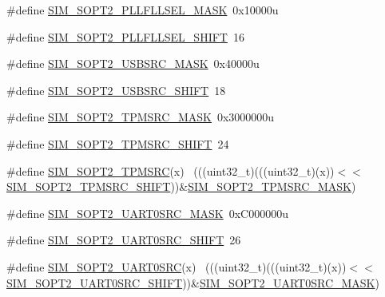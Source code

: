 \begin{DoxyCompactItemize}
\item 
\#define \hyperlink{group___s_i_m___register___masks_gaa14141a225f9778babacbf3b90d0bae2}{S\+I\+M\+\_\+\+S\+O\+P\+T2\+\_\+\+P\+L\+L\+F\+L\+L\+S\+E\+L\+\_\+\+M\+A\+SK}~0x10000u
\item 
\#define \hyperlink{group___s_i_m___register___masks_gae98b4d574b65472bdb294092d4ce5b4a}{S\+I\+M\+\_\+\+S\+O\+P\+T2\+\_\+\+P\+L\+L\+F\+L\+L\+S\+E\+L\+\_\+\+S\+H\+I\+FT}~16
\item 
\#define \hyperlink{group___s_i_m___register___masks_ga1caf7ffe2555eb59ed410110b6aba463}{S\+I\+M\+\_\+\+S\+O\+P\+T2\+\_\+\+U\+S\+B\+S\+R\+C\+\_\+\+M\+A\+SK}~0x40000u
\item 
\#define \hyperlink{group___s_i_m___register___masks_ga2a455b7e86f26185c92961e139d13a89}{S\+I\+M\+\_\+\+S\+O\+P\+T2\+\_\+\+U\+S\+B\+S\+R\+C\+\_\+\+S\+H\+I\+FT}~18
\item 
\#define \hyperlink{group___s_i_m___register___masks_gab515715932139549d30bb4b6f3e2dc99}{S\+I\+M\+\_\+\+S\+O\+P\+T2\+\_\+\+T\+P\+M\+S\+R\+C\+\_\+\+M\+A\+SK}~0x3000000u
\item 
\#define \hyperlink{group___s_i_m___register___masks_gac70dc9abda7a707019da3d8fed90a265}{S\+I\+M\+\_\+\+S\+O\+P\+T2\+\_\+\+T\+P\+M\+S\+R\+C\+\_\+\+S\+H\+I\+FT}~24
\item 
\#define \hyperlink{group___s_i_m___register___masks_gabd5461d4ec1af7320ca24eba24866bb7}{S\+I\+M\+\_\+\+S\+O\+P\+T2\+\_\+\+T\+P\+M\+S\+RC}(x)                                        ~(((uint32\+\_\+t)(((uint32\+\_\+t)(x))$<$$<$\hyperlink{group___s_i_m___register___masks_gac70dc9abda7a707019da3d8fed90a265}{S\+I\+M\+\_\+\+S\+O\+P\+T2\+\_\+\+T\+P\+M\+S\+R\+C\+\_\+\+S\+H\+I\+FT}))\&\hyperlink{group___s_i_m___register___masks_gab515715932139549d30bb4b6f3e2dc99}{S\+I\+M\+\_\+\+S\+O\+P\+T2\+\_\+\+T\+P\+M\+S\+R\+C\+\_\+\+M\+A\+SK})
\item 
\#define \hyperlink{group___s_i_m___register___masks_ga9527f6a7148fe172b12a87e0b3b92492}{S\+I\+M\+\_\+\+S\+O\+P\+T2\+\_\+\+U\+A\+R\+T0\+S\+R\+C\+\_\+\+M\+A\+SK}~0x\+C000000u
\item 
\#define \hyperlink{group___s_i_m___register___masks_ga0790a9307dcaad17166308eb2f1b62df}{S\+I\+M\+\_\+\+S\+O\+P\+T2\+\_\+\+U\+A\+R\+T0\+S\+R\+C\+\_\+\+S\+H\+I\+FT}~26
\item 
\#define \hyperlink{group___s_i_m___register___masks_gad369490bacab902bab4d71b8396c896d}{S\+I\+M\+\_\+\+S\+O\+P\+T2\+\_\+\+U\+A\+R\+T0\+S\+RC}(x)                                    ~(((uint32\+\_\+t)(((uint32\+\_\+t)(x))$<$$<$\hyperlink{group___s_i_m___register___masks_ga0790a9307dcaad17166308eb2f1b62df}{S\+I\+M\+\_\+\+S\+O\+P\+T2\+\_\+\+U\+A\+R\+T0\+S\+R\+C\+\_\+\+S\+H\+I\+FT}))\&\hyperlink{group___s_i_m___register___masks_ga9527f6a7148fe172b12a87e0b3b92492}{S\+I\+M\+\_\+\+S\+O\+P\+T2\+\_\+\+U\+A\+R\+T0\+S\+R\+C\+\_\+\+M\+A\+SK})

\end{DoxyCompactItemize}
